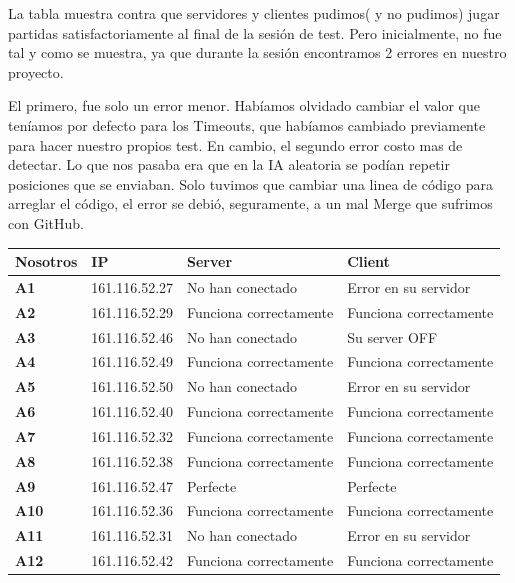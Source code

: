 La tabla muestra contra que servidores y clientes pudimos( y no pudimos) jugar partidas satisfactoriamente al final de la sesión de test. Pero inicialmente, no fue tal y como se muestra, ya que durante la sesión encontramos 2 errores en nuestro proyecto.

El primero, fue solo un error menor. Habíamos olvidado cambiar el valor que teníamos por defecto para los Timeouts, que habíamos cambiado previamente para hacer nuestro propios test.
En cambio, el segundo error costo mas de detectar. Lo que nos pasaba era que en la IA aleatoria se podían repetir posiciones que se enviaban. Solo tuvimos que cambiar una linea de código para arreglar el código, el error se debió, seguramente, a un mal Merge que sufrimos con GitHub.

\begin{center}
    \begin{tabular}{| l || l | l | l |}
    \hline
    \textbf{Nosotros} & \textbf{IP} & \textbf{Server} & \textbf{Client} \\ \hline
    \textbf{A1} & 161.116.52.27 & No han conectado  & Error en su servidor \\ \hline
       \textbf{A2} & 161.116.52.29 &  Funciona correctamente & Funciona correctamente\\ \hline
       \textbf{A3}     & 161.116.52.46 & No han conectado   & Su server OFF\\ \hline
       \textbf{A4}     & 161.116.52.49 & Funciona correctamente  & Funciona correctamente\\ \hline
       \textbf{A5}     & 161.116.52.50 & No han conectado   & Error en su servidor\\ \hline
       \textbf{A6}     & 161.116.52.40 & Funciona correctamente  & Funciona correctamente\\ \hline
       \textbf{A7}     & 161.116.52.32 & Funciona correctamente  & Funciona correctamente\\ \hline
       \textbf{A8}     & 161.116.52.38 & Funciona correctamente  & Funciona correctamente\\ \hline
       \textbf{A9}     & 161.116.52.47 & Perfecte  & Perfecte\\ \hline
       \textbf{A10}     & 161.116.52.36 &  Funciona correctamente & Funciona correctamente\\ \hline
       \textbf{A11}     & 161.116.52.31 & No han conectado   & Error en su servidor\\ \hline
       \textbf{A12}     & 161.116.52.42 & Funciona correctamente  & Funciona correctamente\\ \hline
    \end{tabular}
\end{center}



